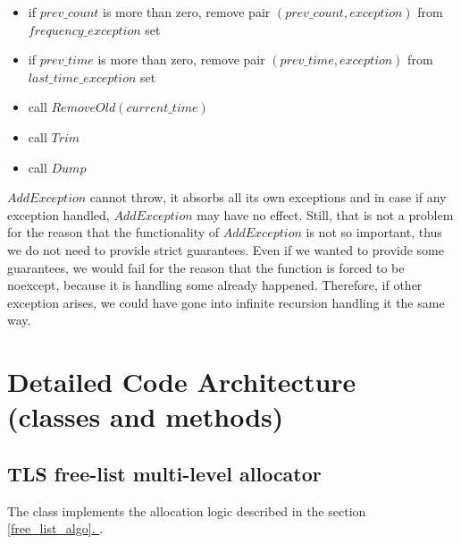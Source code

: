 \documentclass{article}
\newcommand*{\fullref}[1]{\hyperref[{#1}]{\ref*{#1}. \nameref*{#1}}}
\begin{document}
\begin{itemize}
	\item if $prev\_count$ is more than zero, remove pair $(prev\_count, exception)$ from \\
		$frequency\_exception$ set
	\item if $prev\_time$ is more than zero, remove pair $(prev\_time, exception)$ from \\
		$last\_time\_exception$ set
	\item call $RemoveOld(current\_time)$
	\item call $Trim$
	\item call $Dump$
\end{itemize}

$AddException$ cannot throw, it absorbs all its own exceptions and in case if any exception handled, $AddException$ may have no effect. Still, that is not a problem for the reason that the functionality of $AddException$ is not so important, thus we do not need to provide strict guarantees. Even if we wanted to provide some guarantees, we would fail for the reason that the function is forced to be noexcept, because it is handling some already happened. Therefore, if other exception arises, we could have gone into infinite recursion handling it the same way.

\newpage
\section{Detailed Code Architecture (classes and methods)}

\subsection{TLS free-list multi-level allocator}

The class implements the allocation logic described in the section \fullref{free_list_algo}.
\end{document}
